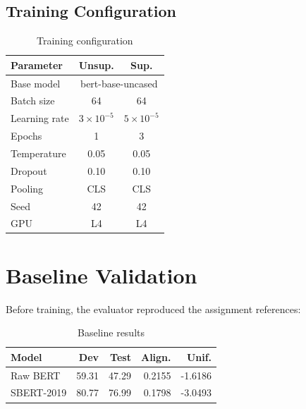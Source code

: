 \documentclass[10pt,conference]{IEEEtran}
\begin{document}
\subsection{Training Configuration}
\begin{table}[H]
\centering
\caption{Training configuration}
\begin{tabular}{lcc}
\toprule
\textbf{Parameter} & \textbf{Unsup.} & \textbf{Sup.} \\
\midrule
Base model & \multicolumn{2}{c}{bert-base-uncased} \\
Batch size & 64 & 64 \\
Learning rate & $3\times10^{-5}$ & $5\times10^{-5}$ \\
Epochs & 1 & 3 \\
Temperature & 0.05 & 0.05 \\
Dropout & 0.10 & 0.10 \\
Pooling & CLS & CLS \\
Seed & 42 & 42 \\
GPU & L4 & L4 \\
\bottomrule
\end{tabular}
\end{table}

\section{Baseline Validation}
Before training, the evaluator reproduced the assignment references:
\begin{table}[H]
\centering
\caption{Baseline results}
\begin{tabular}{lrrrr}
\toprule
\textbf{Model} & \textbf{Dev} & \textbf{Test} & \textbf{Align.} & \textbf{Unif.} \\
\midrule
Raw BERT & 59.31 & 47.29 & 0.2155 & -1.6186 \\
SBERT-2019 & 80.77 & 76.99 & 0.1798 & -3.0493 \\
\bottomrule
\end{tabular}
\end{table}
\end{document}
